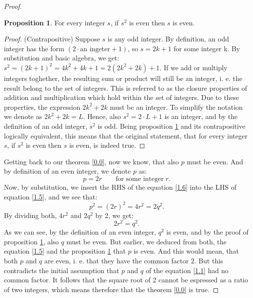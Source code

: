 \documentclass[11pt]{amsart}
\theoremstyle{definition}
\newtheorem{proposition}{Proposition}
\begin{document}
\begin{proof}
    \begin{proposition}\label{2.1}
        For every integer \(s\), if \(s^{2}\) is even then \(s\) is even.
    \end{proposition}
    \begin{proof}
        (Contrapositive) Suppose \(s\) is any odd integer. By definition, an odd integer has the form \((2 \cdot \text{an ingeter} + 1)\), so \(s = 2k + 1\) for some integer k. By substitution and basic algebra, we get: \(s^{2} = (2k + 1)^{2} = 4k^{2} + 4k + 1 = 2(2k^{2} + 2k) + 1.\)
        If we add or multiply integers toghether, the resulting sum or product will still be an integer, i. e. the result belong to the set of integers. This is referred to as the closure properties of addition and multiplication which hold within the set of integers. Due to these properties, the expression \(2k^{2} + 2k\) must be an integer. To simplify the notation we denote as \(2k^{2} + 2k = L\). Hence, also \(s^{2} = 2 \cdot L + 1\) is an integer, and by the definition of an odd integer, \(s^{2}\) is odd. Being proposition \ref{2.1} and its contrapositive logically equivalent, this means that the original statement, that for every integer \(s\), if \(s^{2}\) is even then \(s\) is even, is indeed true.
    \end{proof}
    Getting back to our theorem \ref{0.0}, now we know, that also \(p\) must be even. And by definition of an even integer, we denote \(p\) as:
    \begin{equation}\label{1.6}
        p = 2r \qquad \text{for some integer} \; r.
    \end{equation}
    Now, by substitution, we insert the RHS of the equation \ref{1.6} into the LHS of equation \ref{1.5}, and we see that:
    \begin{equation}\label{1.7}
        p^{2} = (2r)^{2} = 4r^{2} = 2q^{2}.
    \end{equation}
    By dividing both, \(4r^{2}\) and \(2q^{2}\) by \(2\), we get:
    \begin{equation}\label{1.8}
        2r^{2} = q^{2}.
    \end{equation}
    As we can see, by the definition of an even integer, \(q^{2}\) is even, and by the proof of proposition \ref{2.1}, also \(q\) must be even.
    But earlier, we deduced from both, the equation \ref{1.5} and the proposition \ref{2.1} that \(p\) is even.
    And this would mean, that both \(p\) and \(q\) are even, i. e. that they have the common factor \(2\).
    But this contradicts the initial assumption that \(p\) and \(q\) of the equation \ref{1.1} had no common factor.
    It follows that the square root of \(2\) cannot be espressed as a ratio of two integers, which means therefore that the theorem \ref{0.0} is true.
\end{proof}





\printbibliography
\end{document}
